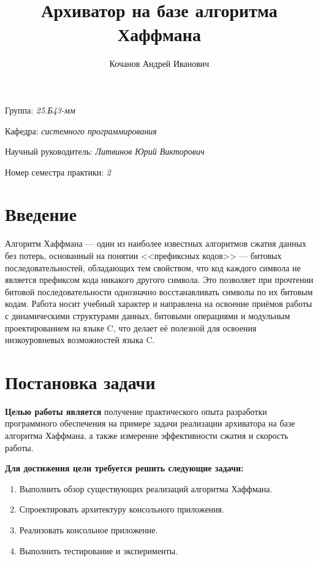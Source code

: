 \documentclass[a4paper]{article}
\title{Архиватор на базе алгоритма Хаффмана}
\author{Кочанов Андрей Иванович}
\date{}
\begin{document}
\maketitle

\begin{flushright}
    Группа: \emph{25.Б43-мм}

    Кафедра: \emph{системного программирования}

    Научный руководитель: \emph{Литвинов Юрий Викторович}

    Номер семестра практики: \emph{2}
\end{flushright} 

\section{Введение}

Алгоритм Хаффмана — один из наиболее известных алгоритмов сжатия данных без потерь, основанный на понятии <<префиксных кодов>> — битовых последовательностей, обладающих тем свойством, что код каждого символа не является префиксом кода никакого другого символа. Это позволяет при прочтении битовой последовательности однозначно восстанавливать символы по их битовым кодам. Работа носит учебный характер и направлена на освоение приёмов работы с динамическими структурами данных, битовыми операциями и модульным проектированием на языке C, что делает её полезной для освоения низкоуровневых возможностей языка C.

\section{Постановка задачи}

\textbf{Целью работы является} получение практического опыта разработки программного обеспечения на примере задачи реализации архиватора на базе алгоритма Хаффмана, а также измерение эффективности сжатия и скорость работы.

\textbf{Для достижения цели требуется решить следующие задачи:}
\begin{enumerate}
    \item Выполнить обзор существующих реализаций алгоритма Хаффмана.
    \item Спроектировать архитектуру консольного приложения.
    \item Реализовать консольное приложение.
    \item Выполнить тестирование и эксперименты.
\end{enumerate}
\end{document}
